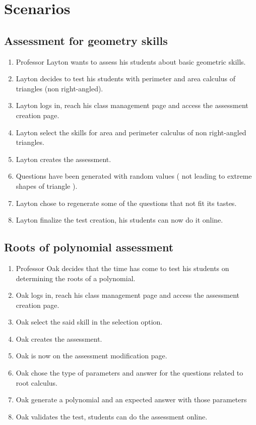 \documentclass{article}
\begin{document}
\section{Scenarios}

    \subsection{Assessment for geometry skills}

        \begin{enumerate}

            \item Professor Layton wants to assess his students about basic geometric
            skills.
            \item Layton decides to test his students with perimeter and area
            calculus of triangles (non right-angled).
            \item Layton logs in, reach his class management page and access the
            assessment creation page.
            \item Layton select the skills for area and perimeter calculus of
            non right-angled triangles.
            \item Layton creates the assessment.
            \item Questions have been generated with random values ( not leading
            to extreme shapes of triangle ).
            \item Layton chose to regenerate some of the questions that not
            fit its tastes.
            \item Layton finalize the test creation, his students can now do it online.
        \end{enumerate}

    \subsection{Roots of polynomial assessment}

        \begin{enumerate}
            \item Professor Oak decides that the time has come to test his students
            on determining the roots of a polynomial.
            \item Oak logs in, reach his class management page and access the
            assessment creation page.
            \item Oak select the said skill in the selection option.
            \item Oak creates the assessment.
            \item Oak is now on the assessment modification page.
            \item Oak chose the type of parameters and answer for the questions
            related to root calculus.
            \item Oak generate a polynomial and an expected answer with those
            parameters
            \item Oak validates the test, students can do the assessment online.
        \end{enumerate}
\end{document}
